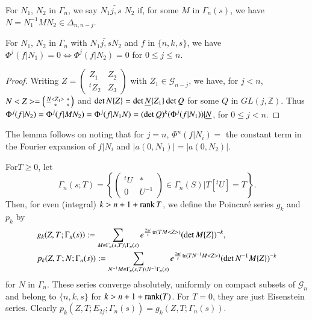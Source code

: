 \begin{defi*}
For $N_{1}$, $N_{2}$ in $\Gamma_{n}$, we say $N_{1}\tilde{j,s}$
$N_{2}$ if, for some $M$ in $\Gamma_{n}(s)$, we have
$N=N^{-1}_{1}MN_{2}\in\Delta_{n,n-j}$. 
\end{defi*}

\begin{sublemma}\label{c1:lem-1.6.3}
For $N_{1}$, $N_{2}$ in $\Gamma_{n}$ with $N_{1}\tilde{j,s}N_{2}$
and $f$ in $\{n,k,s\}$, we have
$\Phi^{j}(f|N_{1})=0\Longleftrightarrow \Phi^{j}(f|N_{2})=0$ for
$0\leq j\leq n$.
\end{sublemma}

\begin{proof}
Writing $Z=\left(\begin{smallmatrix} Z_{1} & Z_{2}\\ {}^{t}Z_{2} &
  Z_{3}
\end{smallmatrix}\right)$ with $Z_{1}\in\mathscr{G}_{n-j}$, we have,
for $j<n$, $N<Z>=\left(\begin{smallmatrix} \underline{N}<Z_{1}> & \ast\\ \ast
  & \ast\end{smallmatrix}\right)$ and $\det
  N\{Z\}=\det\underline{N}\{Z_{1}\}\det Q$ for some $Q$ in
  $GL(j,\mathbb{Z})$. Thus
  $\Phi^{j}(f|N_{2})=\Phi^{j}(f|MN_{2})=\Phi^{j}(f|N_{1}N)=(\det
  Q)^{k}(\Phi^{j}(f|N_{1}))|\underline{N}$, for $0\leq j<n$.
\end{proof}

The lemma follows on noting that for $j=n$, $\Phi^{n}(f|N_{i})=$ the
constant term in the Fourier expansion of $f|N_{i}$ and
$|a(0,N_{1})|=|a(0,N_{2})|$. 

For\pageoriginale $T\geq 0$, let 
$$
\Gamma_{n}(s;T)=
\left\{
\begin{pmatrix}
{}^{t}U & \ast\\
0 & U^{-1}
\end{pmatrix}
\in\Gamma_{n}(S)|T[{}^{t}U]=T\right\}.
$$
Then, for even (integral) $k>n+1+\operatorname{rank} T$, we define the Poincar\'e
series $g_{k}$ and $p_{k}$ by
{\fontsize{10}{12}\selectfont
\begin{align*}
& g_{k}(Z,T;\Gamma_{n}(s)): = \sum_{M\in\Gamma_{n}(s,T)\backslash \Gamma_{n}(s)}e^{\frac{2\pi
    i}{s}\operatorname{tr}(TM<Z>)}(\det M\{Z\})^{-k},\\
&
  p_{k}(Z,T;N;\Gamma_{n}(s)):=\sum_{N^{-1}M\in\Gamma_{n}(s,T)\backslash
    N^{-1}\Gamma_{n}(s)}e^{\frac{2\pi i}{s}\operatorname{tr}(TN^{-1}M<Z>)}(\det
  N^{-1}M\{Z\})^{-k} 
\end{align*}}
for $N$ in $\Gamma_{n}$. These series converge absolutely, uniformly
on compact subsets of $\mathscr{G}_{n}$ and belong to $\{n,k,s\}$ for
$k>n+1+\operatorname{rank} (T)$. For $T=0$, they are just Eisenstein series. Clearly
$p_{k}(Z,T;E_{2j};\Gamma_{n}(s))=g_{k}(Z,T;\Gamma_{n}(s))$. 


